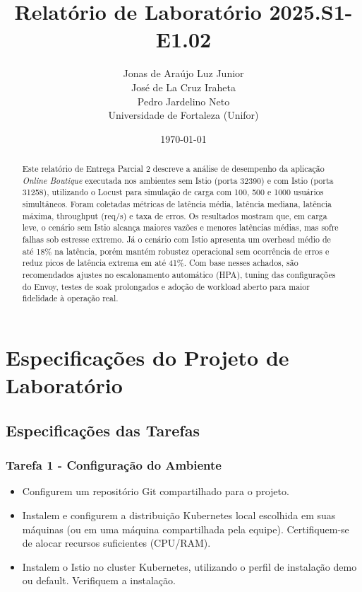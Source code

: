\documentclass[12pt,a4paper]{report}
\title{Relatório de Laboratório 2025.S1-E1.02}
\author{
    Jonas de Araújo Luz Junior \\
    José de La Cruz Iraheta \\
    Pedro Jardelino Neto \\
    \small{Universidade de Fortaleza (Unifor)}
}
\date{\today}
\begin{document}
\maketitle
\tableofcontents
\clearpage

\begin{abstract}    
Este relatório de Entrega Parcial 2 descreve a análise de desempenho da aplicação \textit{Online Boutique} executada nos ambientes sem Istio (porta 32390) e com Istio (porta 31258), utilizando o Locust para simulação de carga com 100, 500 e 1000 usuários simultâneos. 
Foram coletadas métricas de latência média, latência mediana, latência máxima, throughput (req/s) e taxa de erros. Os resultados mostram que, em carga leve, o cenário sem Istio alcança maiores vazões e menores latências médias, mas sofre falhas sob estresse extremo. 
Já o cenário com Istio apresenta um overhead médio de até 18\% na latência, porém mantém robustez operacional sem ocorrência de erros e reduz picos de latência extrema em até 41\%. Com base nesses achados, são recomendados ajustes no escalonamento automático (HPA), tuning das configurações do Envoy, testes de soak prolongados e adoção de workload aberto para maior fidelidade à operação real.
\end{abstract}

\chapter{Especificações do Projeto de Laboratório}

\section{Especificações das Tarefas}
\subsection{Tarefa 1 - Configuração do Ambiente}
\begin{itemize}
    \item Configurem um repositório Git compartilhado para o projeto.
    \item Instalem e configurem a distribuição Kubernetes local escolhida em suas máquinas (ou em uma máquina compartilhada pela equipe). Certifiquem-se de alocar recursos suficientes (CPU/RAM).
    \item Instalem o Istio no cluster Kubernetes, utilizando o perfil de instalação demo ou default. Verifiquem a instalação.
\end{itemize}
\end{document}
